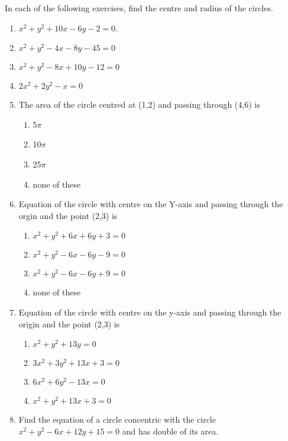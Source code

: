 In each of the following exercises,  find the centre and radius of the circles.
\begin{enumerate}[label=\thesubsection.\arabic*,ref=\thesubsection.\theenumi,resume*]
\item  $x^2+y^2 +10x -6y -2=0$. 
	 \\
		\solution
\label{chapters/11/11/1/6}

\item  $x^{2}+y^{2}-4 x-8 y-45=0$
	 \\
		\solution
\label{chapters/11/11/1/7}

\item  $x^{2}+y^{2}-8 x+10 y-12=0$ 
	 \\
		\solution
\label{chapters/11/11/1/8}

\item  $2 x^{2}+2 y^{2}-x=0$
	 \\
		\solution
\label{chapters/11/11/1/9}

\item The area of the circle centred at (1,2) and passing through (4,6) is
\begin{enumerate}
\item 5$\pi$ 
\item 10$\pi$
 \item 25$\pi$ 
\item none of these
\end{enumerate}
\item Equation of the circle with centre on the Y-axis and passing through the orgin and the point (2,3) is
\begin{enumerate}
\item $x^2+y^2+6x+6y+3=0$ 
\item $x^2+y^2-6x-6y-9=0$
\item $x^2+y^2-6x-6y+9=0$
\item none of these
\end{enumerate}
\item Equation of the circle with centre on the  y-axis and passing through the origin and the point (2,3) is  
\begin{enumerate}
\item $x^2+y^2+13y=0$
\item $3x^2+3y^2+13x+3=0$
\item $6x^2+6y^2-13x=0$
\item $x^2+y^2+13x+3=0$
\end{enumerate}
 \item Find the equation of a circle concentric with the circle $x^2+y^2-6x+12y+15=0$ and has double of its area.

\end{enumerate}

